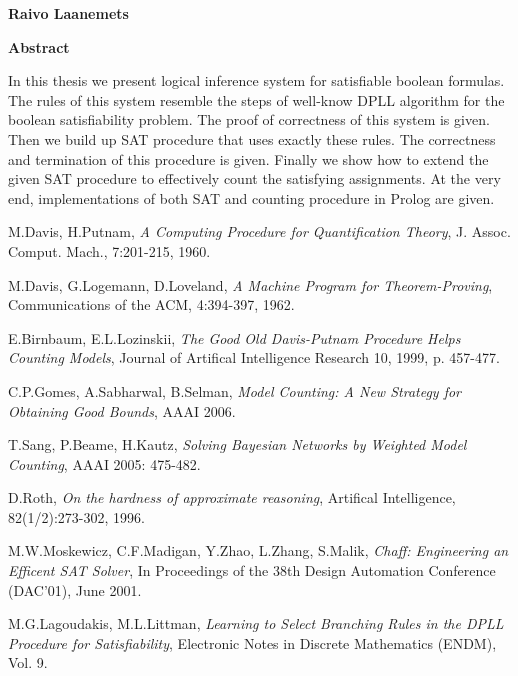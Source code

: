 \documentclass[12pt,estonian]{report}
\newcounter{algorithm_counter}\setcounter{algorithm_counter}{1}
\begin{document}
{\textbf{\Large Raivo Laanemets}}

\vspace{1cm}

{\textbf{\Large Abstract}}

\vspace{1cm}

In this thesis we present logical inference system for satisfiable
boolean formulas. The rules of this system resemble the steps of well-know
DPLL algorithm for the boolean satisfiability problem. The proof of correctness
of this system is given. Then we build up SAT procedure that
uses exactly these rules. The correctness and termination of this
procedure is given. Finally we show how to extend the given SAT procedure
to effectively count the satisfying assignments. At the very end, implementations
of both SAT and counting procedure in Prolog are given.



\begin{thebibliography}{20}

M.Davis, H.Putnam, \emph{A Computing Procedure for
Quantification Theory},
J. Assoc. Comput. Mach., 7:201-215, 1960.

M.Davis, G.Logemann, D.Loveland, \emph{A Machine Program
for Theorem-Proving},
Communications of the ACM, 4:394-397, 1962.

E.Birnbaum, E.L.Lozinskii, \emph{The Good Old Davis-Putnam
Procedure Helps Counting Models},
Journal of Artifical Intelligence Research 10, 1999, p. 457-477.

C.P.Gomes, A.Sabharwal, B.Selman, \emph{Model Counting:
A New Strategy for Obtaining Good Bounds},
AAAI 2006.

T.Sang, P.Beame, H.Kautz, \emph{Solving Bayesian Networks
by Weighted Model Counting},
AAAI 2005: 475-482.

D.Roth, \emph{On the hardness of approximate reasoning},
Artifical Intelligence, 82(1/2):273-302, 1996.

M.W.Moskewicz, C.F.Madigan, Y.Zhao, L.Zhang, S.Malik,
\emph{Chaff: Engineering an Efficent SAT Solver},
In Proceedings of the 38th Design Automation Conference (DAC'01), June 2001.

M.G.Lagoudakis, M.L.Littman, \emph{Learning to Select
Branching Rules in the DPLL Procedure for Satisfiability},
Electronic Notes in Discrete Mathematics (ENDM), Vol. 9.
\end{thebibliography}
\end{document}
